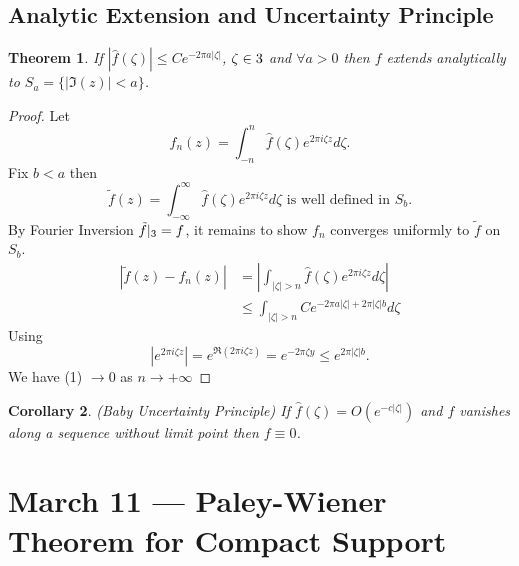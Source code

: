 \documentclass[a4paper]{article}
\newtheorem{thm}{Theorem}[section]
\newtheorem{cor}[thm]{Corollary}
\begin{document}
\subsection{Analytic Extension and Uncertainty Principle}
\begin{thm}
    If $|\hat{f}(\zeta)|\leq Ce^{-2\pi a |\zeta|}$, $\zeta\in 3$ and $\forall a>0$ then $f$ extends analytically to $S_a= \{|\Im(z)|<a\}$. 
\end{thm}
\begin{proof}
    Let \[
        f_n(z)=\int_{-n}^n \hat{f}(\zeta)e^{2\pi i \zeta z}d\zeta
    .\] 
    Fix $b<a$ then 
    \[
    \tilde{f}(z)=\int_{-\infty}^\infty \hat{f}(\zeta)e^{2\pi i \zeta z}d\zeta \text{ is well defined in } S_b
    .\] 
    By Fourier Inversion $\tilde{f}|_3=f$, it remains to show $f_n$ converges uniformly to $\tilde{f}$ on $S_b$. 
    \begin{align*}
        \left |\tilde{f}(z)-f_n(z) \right |&= \left | \int_{|\zeta|>n} \hat{f}(\zeta)e^{2\pi i \zeta z}d\zeta \right |\\
        &\leq \int_{|\zeta|>n} Ce^{-2\pi a |\zeta|+2\pi|\zeta|b}d\zeta \tag{1}
    \end{align*}
    Using 
    \[
    \left | e^{2\pi i \zeta z}\right | =e^{\Re(2\pi i \zeta z)}=e^{-2\pi \zeta y}\leq e^{2\pi |\zeta|b}
    .\] 
    We have (1) $\to 0$ as $n\to +\infty$ 
\end{proof}
\begin{cor}
    (Baby Uncertainty Principle) If $\hat{f}(\zeta)=O(e^{-c|\zeta|})$ and $f$ vanishes along a sequence without limit point then $f\equiv 0$. 
\end{cor}
\newpage
\section{March 11 --- Paley-Wiener Theorem for Compact Support}
\end{document}
